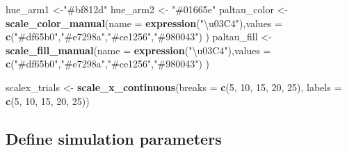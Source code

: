 \documentclass[
]{article}
\newenvironment{Shaded}{\begin{snugshade}}{\end{snugshade}}
\newcommand{\AttributeTok}[1]{\textcolor[rgb]{0.13,0.29,0.53}{#1}}
\newcommand{\DecValTok}[1]{\textcolor[rgb]{0.00,0.00,0.81}{#1}}
\newcommand{\FunctionTok}[1]{\textcolor[rgb]{0.13,0.29,0.53}{\textbf{#1}}}
\newcommand{\NormalTok}[1]{#1}
\newcommand{\OtherTok}[1]{\textcolor[rgb]{0.56,0.35,0.01}{#1}}
\newcommand{\StringTok}[1]{\textcolor[rgb]{0.31,0.60,0.02}{#1}}
\begin{document}
\begin{Shaded}
\begin{Highlighting}[]
\NormalTok{hue\_arm1 }\OtherTok{\textless{}{-}}\StringTok{"\#bf812d"}
\NormalTok{hue\_arm2 }\OtherTok{\textless{}{-}} \StringTok{"\#01665e"}
\NormalTok{paltau\_color }\OtherTok{\textless{}{-}} \FunctionTok{scale\_color\_manual}\NormalTok{(}\AttributeTok{name =} \FunctionTok{expression}\NormalTok{(}\StringTok{"\textbackslash{}u03C4"}\NormalTok{),}\AttributeTok{values =}  \FunctionTok{c}\NormalTok{(}\StringTok{"\#df65b0"}\NormalTok{,}\StringTok{"\#e7298a"}\NormalTok{,}\StringTok{"\#ce1256"}\NormalTok{,}\StringTok{"\#980043"}\NormalTok{) )}
\NormalTok{paltau\_fill }\OtherTok{\textless{}{-}} \FunctionTok{scale\_fill\_manual}\NormalTok{(}\AttributeTok{name =} \FunctionTok{expression}\NormalTok{(}\StringTok{"\textbackslash{}u03C4"}\NormalTok{),}\AttributeTok{values =}  \FunctionTok{c}\NormalTok{(}\StringTok{"\#df65b0"}\NormalTok{,}\StringTok{"\#e7298a"}\NormalTok{,}\StringTok{"\#ce1256"}\NormalTok{,}\StringTok{"\#980043"}\NormalTok{) )}

\NormalTok{scalex\_trials }\OtherTok{\textless{}{-}}  \FunctionTok{scale\_x\_continuous}\NormalTok{(}\AttributeTok{breaks =} \FunctionTok{c}\NormalTok{(}\DecValTok{5}\NormalTok{, }\DecValTok{10}\NormalTok{, }\DecValTok{15}\NormalTok{, }\DecValTok{20}\NormalTok{, }\DecValTok{25}\NormalTok{), }\AttributeTok{labels =} \FunctionTok{c}\NormalTok{(}\DecValTok{5}\NormalTok{, }\DecValTok{10}\NormalTok{, }\DecValTok{15}\NormalTok{, }\DecValTok{20}\NormalTok{, }\DecValTok{25}\NormalTok{))}
\end{Highlighting}
\end{Shaded}

\subsection{Define simulation
parameters}\label{define-simulation-parameters-1}
\end{document}
